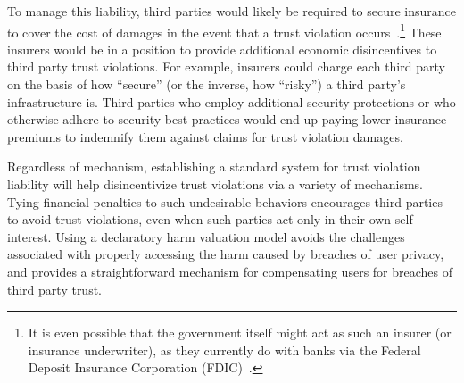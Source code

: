 To manage this liability, third parties would likely be required to
secure insurance to cover the cost of damages in the event that a
trust violation occurs~\cite{ciab2015, starks2016}.\footnote{It is
  even possible that the government itself might act as such an
  insurer (or insurance underwriter), as they currently do with banks
  via the Federal Deposit Insurance Corporation (FDIC)~\cite{fdic}.}
These insurers would be in a position to provide additional economic
disincentives to third party trust violations. For example, insurers
could charge each third party on the basis of how ``secure'' (or the
inverse, how ``risky'') a third party's infrastructure is. Third
parties who employ additional security protections or who otherwise
adhere to security best practices would end up paying lower insurance
premiums to indemnify them against claims for trust violation damages.

Regardless of mechanism, establishing a standard system for trust
violation liability will help disincentivize trust violations via a
variety of mechanisms. Tying financial penalties to such undesirable
behaviors encourages third parties to avoid trust violations, even
when such parties act only in their own self interest. Using a
declaratory harm valuation model avoids the challenges associated with
properly accessing the harm caused by breaches of user privacy, and
provides a straightforward mechanism for compensating users for
breaches of third party trust.

